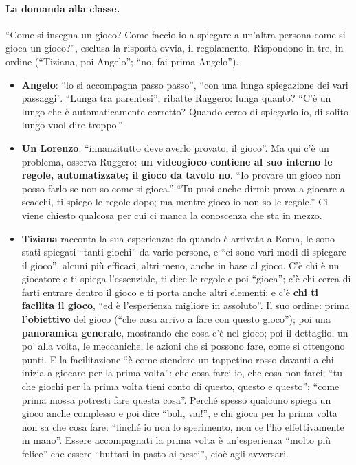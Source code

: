 \paragraph{La domanda alla classe.} ``Come si insegna un gioco? Come faccio io a
spiegare a un'altra persona come si gioca un gioco?'', esclusa la risposta ovvia, il
regolamento. Rispondono in tre, in ordine (``Tiziana, poi Angelo''; ``no, fai prima
Angelo'').
\begin{itemize}
  \item \textbf{Angelo}: ``lo si accompagna passo passo'', ``con una lunga spiegazione dei
        vari passaggi''. ``Lunga tra parentesi'', ribatte Ruggero: lunga quanto? ``C'è un
        lungo che è automaticamente corretto? Quando cerco di spiegarlo io, di solito
        lungo vuol dire troppo.''
  \item \textbf{Un Lorenzo}: ``innanzitutto deve averlo provato, il gioco''. Ma qui c'è un
        problema, osserva Ruggero: \textbf{un videogioco contiene al suo interno le regole,
        automatizzate; il gioco da tavolo no}. ``Io provare un gioco non posso farlo se
        non so come si gioca.'' ``Tu puoi anche dirmi: prova a giocare a scacchi, ti
        spiego le regole dopo; ma mentre gioco io non so le regole.'' Ci viene chiesto
        qualcosa per cui ci manca la conoscenza che sta in mezzo.
  \item \textbf{Tiziana} racconta la sua esperienza: da quando è arrivata a Roma, le sono
        stati spiegati ``tanti giochi'' da varie persone, e ``ci sono vari modi di
        spiegare il gioco'', alcuni più efficaci, altri meno, anche in base al gioco. C'è
        chi è un giocatore e ti spiega l'essenziale, ti dice le regole e poi ``gioca''; c'è
        chi cerca di farti entrare dentro il gioco e ti porta anche altri elementi; e c'è
        \textbf{chi ti facilita il gioco}, ``ed è l'esperienza migliore in assoluto''. Il
        suo ordine: prima \textbf{l'obiettivo} del gioco (``che cosa arrivo a fare con
        questo gioco''); poi una \textbf{panoramica generale}, mostrando che cosa c'è nel
        gioco; poi il dettaglio, un po' alla volta, le meccaniche, le azioni che si possono
        fare, come si ottengono punti. E la facilitazione ``è come stendere un tappetino
        rosso davanti a chi inizia a giocare per la prima volta'': che cosa farei io, che
        cosa non farei; ``tu che giochi per la prima volta tieni conto di questo, questo e
        questo''; ``come prima mossa potresti fare questa cosa''. Perché spesso qualcuno
        spiega un gioco anche complesso e poi dice ``boh, vai!'', e chi gioca per la
        prima volta non sa che cosa fare: ``finché io non lo sperimento, non ce l'ho
        effettivamente in mano''. Essere accompagnati la prima volta è un'esperienza
        ``molto più felice'' che essere ``buttati in pasto ai pesci'', cioè agli
        avversari.
\end{itemize}

